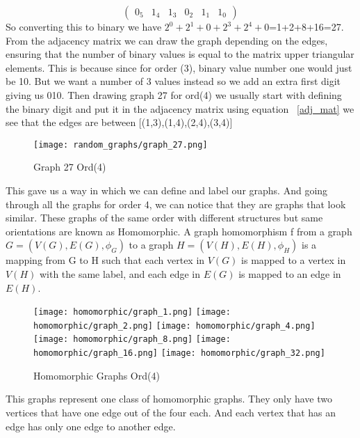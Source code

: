 \documentclass[12pt, a4paper]{Assignment}
\begin{document}
\begin{equation}
	\begin{pmatrix}
		0_5&1_4&1_3&0_2&1_1&1_0
	\end{pmatrix}\label{binary_matrix}
\end{equation}
So converting this to binary we have $2^0+2^1+0+2^3+2^4+0$=1+2+8+16=27.\newline
From the adjacency matrix we can draw the graph depending on the edges, ensuring that the number of binary values is equal to the matrix upper triangular elements.
This is because since for order (3), binary value number one would just be 10.
But we want a number of 3 values instead so we add an extra first digit giving us 010.
Then drawing graph 27 for ord(4) we usually start with defining the binary digit and put it in the adjacency matrix using equation ~\ref{adj_mat} we see that the edges are between [(1,3),(1,4),(2,4),(3,4)] 
\begin{figure}[H]
	\centering
	\texttt{[image: random\_graphs/graph\_27.png]}
	\caption{Graph 27 Ord(4)}
	\label{graph 27}
\end{figure}
This gave us a way in which we can define and label our graphs.
And going through all the graphs for order 4, we can notice that they are graphs that look similar.
These graphs of the same order with different structures but same orientations are known as Homomorphic. 
A graph homomorphism f from a graph $G = (V(G),E(G), \phi_G)$ to a graph $H =(V(H),E(H),\phi_H)$
is a mapping from G to H such that each vertex in
$V(G)$ is mapped to a vertex in $V(H)$ with the same label,
and each edge in $E(G)$ is mapped to an edge in $E(H)$. \cite{fan2010graph}
\begin{figure}[H]
	\texttt{[image: homomorphic/graph\_1.png]}
	\texttt{[image: homomorphic/graph\_2.png]}
	\texttt{[image: homomorphic/graph\_4.png]}
	\texttt{[image: homomorphic/graph\_8.png]}
	\texttt{[image: homomorphic/graph\_16.png]}
	\texttt{[image: homomorphic/graph\_32.png]}
	\caption{Homomorphic Graphs Ord(4)}
	\label{Homomorphic}
\end{figure}
This graphs represent one class of homomorphic graphs.
They only have two vertices that have one edge out of the four each.
And each vertex that has an edge has only one edge to another edge.
\newline
\end{document}
